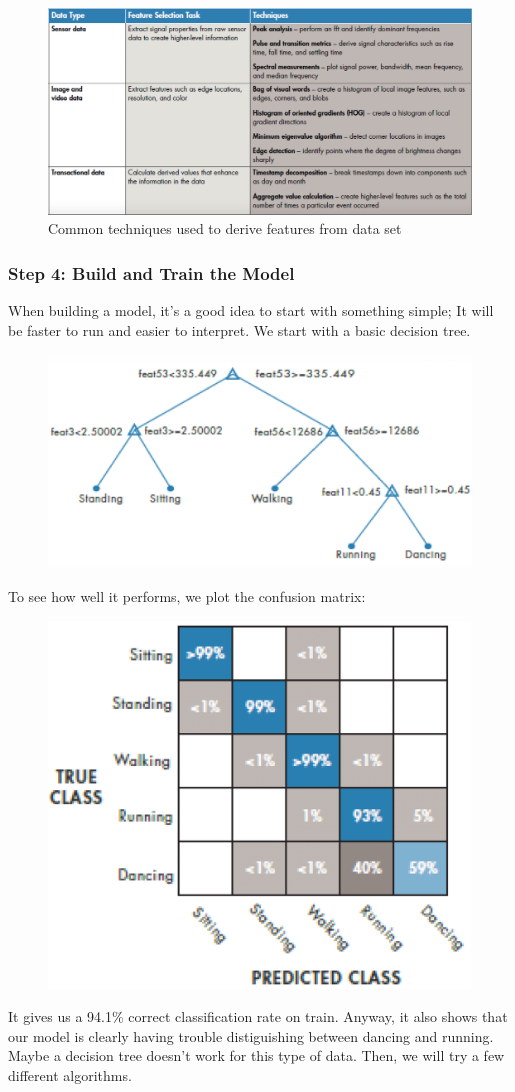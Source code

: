 \documentclass[a4paper]{article}
\begin{document}
			\newpage
		
			\begin{figure}[htb!]
				\centering
				\includegraphics[width=.9\textwidth]{img/sw09/step_03.png}
				\caption{Common techniques used to derive features from data set}
			\end{figure}
			
			\subsubsection{Step 4: Build and Train the Model}
			
			When building a model, it's a good idea to start with something simple;
			It will be faster to run and easier to interpret.
			We start with a basic decision tree.
			
			\begin{figure}[htb!]
				\centering
				\includegraphics[width=.5\textwidth]{img/sw09/step4_tree.png}
			\end{figure}
		\noindent
			To see how well it performs, we plot the confusion matrix:
		
			\begin{figure}[htb!]
				\centering
				\includegraphics[width=.5\textwidth]{img/sw09/step4_matrix.png}
			\end{figure}
		\noindent
			It gives us a 94.1\% correct classification rate on train.
			Anyway, it also shows that our model is clearly having trouble distiguishing between dancing and running.
			Maybe a decision tree doesn't work for this type of data.
			Then, we will try a few different algorithms.
			
\end{document}
